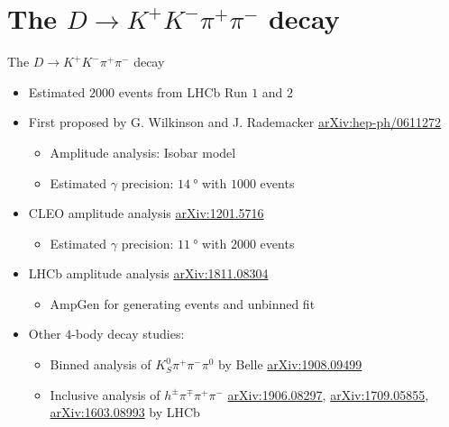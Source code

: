 \documentclass{beamer}
\begin{document}
\section{The \texorpdfstring{$D\to K^+K^-\pi^+\pi^-$}{D to K+K-pi+pi-} decay}
\begin{frame}{The $D\to K^+K^-\pi^+\pi^-$ decay}
  \begin{itemize}
    \item{Estimated $2000$ events from LHCb Run $1$ and $2$}
    \vspace{0.2cm}
    \item{First proposed by G. Wilkinson and J. Rademacker \href{https://arxiv.org/abs/hep-ph/0611272}{arXiv:hep-ph/0611272}}
    \begin{itemize}
      \item{Amplitude analysis: Isobar model}
      \item{Estimated $\gamma$ precision: $\SI{14}{\degree}$ with $1000$ events}
    \end{itemize}
    \vspace{0.2cm}
    \item{CLEO amplitude analysis \href{https://arxiv.org/abs/1201.5716}{arXiv:1201.5716}}
    \begin{itemize}
      \item{Estimated $\gamma$ precision: $\SI{11}{\degree}$ with $2000$ events}
    \end{itemize}
    \vspace{0.2cm}
    \item{LHCb amplitude analysis \href{https://arxiv.org/abs/1811.08304}{arXiv:1811.08304}}
    \begin{itemize}
      \item{AmpGen for generating events and unbinned fit}
    \end{itemize}
    \vspace{0.2cm}
    \item{Other $4$-body decay studies:}
    \begin{itemize}
      \item{Binned analysis of $K_S^0\pi^+\pi^-\pi^0$ by Belle \href{https://arxiv.org/abs/1908.09499}{arXiv:1908.09499}}
      \item{Inclusive analysis of $h^\pm\pi^\mp\pi^+\pi^-$ \href{https://arxiv.org/abs/1906.08297}{arXiv:1906.08297}, \href{https://arxiv.org/abs/1709.05855}{arXiv:1709.05855}, \href{https://arxiv.org/abs/1603.08993}{arXiv:1603.08993} by LHCb}
    \end{itemize}
  \end{itemize}
\end{frame}
\end{document}
